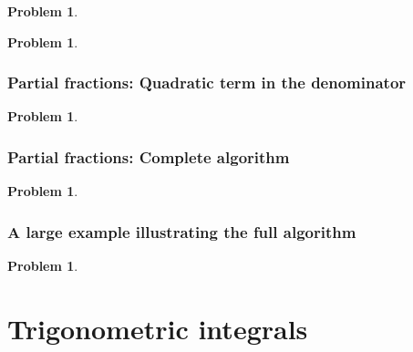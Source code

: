 \documentclass[12pt]{book}
\newtheorem{problem}[theorem]{Problem}
\begin{document}
\begin{problem}

\end{problem}



\begin{problem}

\end{problem}

\subsubsection{Partial fractions: Quadratic term in the denominator}
\begin{problem}

\end{problem}

\subsubsection{Partial fractions: Complete algorithm}
\begin{problem}

\end{problem}


\subsubsection{A large example illustrating the full algorithm}
\begin{problem}

\end{problem}



\section{Trigonometric integrals}\label{secTrigIntegrals}
\end{document}
